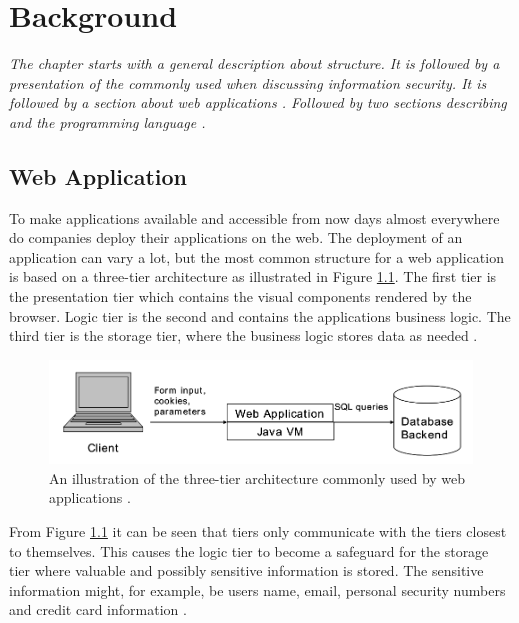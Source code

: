 \chapter{Background}
\label{Background}
\textit{The chapter starts with a general description about \textit{} structure. It is followed by a presentation of the \textit{} commonly used when discussing information security. It is followed by a section about web applications \textit{}. Followed by two sections describing \textit{} and the programming language \textit{}.}



\section{Web Application}
\label{WebApplication}
To make applications available and accessible from now days almost everywhere do companies deploy their applications on the web. The deployment of an application can vary a lot, but the most common structure for a web application is based on a three-tier architecture as illustrated in Figure \ref{fig:webApplication-Haldar}. The first tier is the presentation tier which contains the visual components rendered by the browser. Logic tier is the second and contains the applications business logic. The third tier is the storage tier, where the business logic stores data as needed \parencite{JustinClarke-Salt2009SIAa}.
 
\begin{figure}[H]
  \centering
  \includegraphics[width=\textwidth]{images/webApplication-Haldar.png}
  \caption{An illustration of the three-tier architecture commonly used by web applications \cite{Haldar}.}
  \label{fig:webApplication-Haldar}
\end{figure}

From Figure \ref{fig:webApplication-Haldar} it can be seen that tiers only communicate with the tiers closest to themselves. This causes the logic tier to become a safeguard for the storage tier where valuable and possibly sensitive information is stored. The sensitive information might, for example, be users name, email, personal security numbers and credit card information \parencite{JustinClarke-Salt2009SIAa}.

